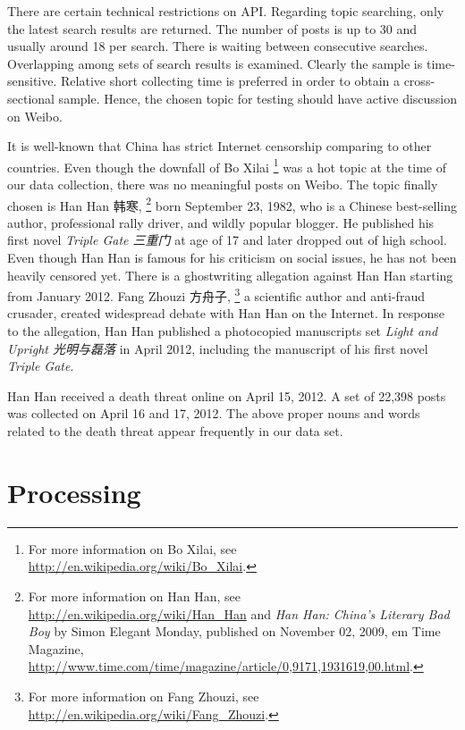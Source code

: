 \documentclass[11pt]{article}
\newcommand{\1}[1]{{\mathbf 1}\left\{#1\right\}}        %
\begin{document}
There are certain technical restrictions on API. Regarding topic searching, only the latest search results are returned. The number of posts is up to 30 and usually around 18 per search. There is waiting between consecutive searches. Overlapping among sets of search results is examined. Clearly the sample is time-sensitive. Relative short collecting time is preferred in order to obtain a cross-sectional sample. Hence, the chosen topic for testing should have active discussion on Weibo. 

It is well-known that China has strict Internet censorship comparing to other countries. Even though the downfall of Bo Xilai
\footnote{For more information on Bo Xilai, see \url{http://en.wikipedia.org/wiki/Bo_Xilai}.}
was a hot topic at the time of our data collection, there was no meaningful posts on Weibo. 
The topic finally chosen is Han Han 韩寒, 
\footnote{For more information on Han Han, see \url{http://en.wikipedia.org/wiki/Han_Han} and {\em Han Han: China's Literary Bad Boy} by Simon Elegant Monday, published on November 02, 2009, {em Time Magazine}, \url{http://www.time.com/time/magazine/article/0,9171,1931619,00.html}.}
born September 23, 1982,
who is a Chinese best-selling author, professional rally driver, and  wildly  popular blogger. He published his first novel {\em Triple Gate 三重门} at age of 17 and later dropped out of high school. Even though Han Han is famous for his criticism on social issues, he has not been heavily censored yet. There is a ghostwriting allegation against Han Han starting from January 2012. Fang Zhouzi 方舟子,
\footnote{For more information on Fang Zhouzi, see \url{http://en.wikipedia.org/wiki/Fang_Zhouzi}.}
 a scientific author and anti-fraud crusader, created widespread debate with Han Han on the Internet. In response to the allegation, Han Han published a photocopied manuscripts set {\em Light and Upright 光明与磊落} in April 2012, including the manuscript of his first novel {\em Triple Gate}. 
 
Han Han received a death threat online on April 15, 2012. A set of 22,398 posts  was collected on April 16 and 17, 2012. The above proper nouns and words related to the death threat appear frequently in our data set. 




\section{Processing}

\end{document}

